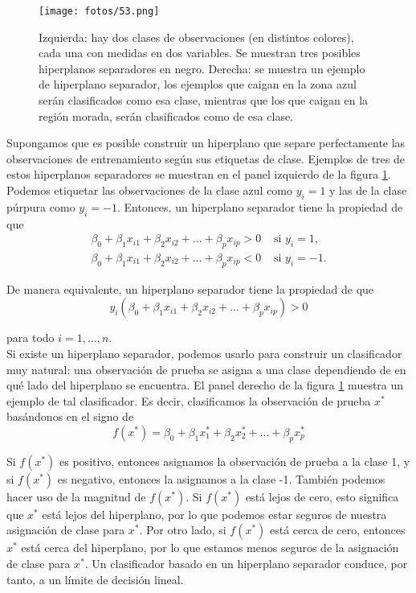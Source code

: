 \begin{figure}[h]
\centering
\texttt{[image: fotos/53.png]}
\caption{Izquierda: hay dos clases de observaciones (en distintos colores), cada una con medidas en dos variables. Se muestran tres posibles hiperplanos separadores en negro. Derecha: se muestra un ejemplo de hiperplano separador, los ejemplos que caigan en la zona azul serán clasificados como esa clase, mientras que los que caigan en la región morada, serán clasificados como de esa clase.}
\label{fig:9.2}
\end{figure}

Supongamos que es posible construir un hiperplano que separe perfectamente las observaciones de entrenamiento según sus etiquetas de clase. Ejemplos de tres de estos hiperplanos separadores se muestran en el panel izquierdo de la figura \ref{fig:9.2}. Podemos etiquetar las observaciones de la clase azul como $y_i = 1$ y las de la clase púrpura como $y_i = -1$. Entonces, un hiperplano separador tiene la propiedad de que
\begin{align}
\beta_0 + \beta_1 x_{i1} + \beta_2 x_{i2} + \ldots + \beta_p x_{ip} > 0 &\text{ si } y_i = 1, \\
\beta_0 + \beta_1 x_{i1} + \beta_2 x_{i2} + \ldots + \beta_p x_{ip} < 0 &\text{ si } y_i = -1.
\end{align}

\noindent De manera equivalente, un hiperplano separador tiene la propiedad de que
\begin{equation}
y_i (\beta_0 + \beta_1 x_{i1} + \beta_2 x_{i2} + \ldots + \beta_p x_{ip}) > 0
\end{equation}

\noindent para todo $i = 1, \ldots, n$. \\

Si existe un hiperplano separador, podemos usarlo para construir un clasificador muy natural: una observación de prueba se asigna a una clase dependiendo de en qué lado del hiperplano se encuentra. El panel derecho de la figura \ref{fig:9.2} muestra un ejemplo de tal clasificador. Es decir, clasificamos la observación de prueba $x^*$ basándonos en el signo de 
\begin{equation}
f(x^*) = \beta_0 + \beta_1 x^*_1 + \beta_2 x^*_2 + \ldots + \beta_p x^*_p
\end{equation}

Si $f(x^*)$ es positivo, entonces asignamos la observación de prueba a la clase 1, y si $f(x^*)$ es negativo, entonces la asignamos a la clase -1. También podemos hacer uso de la magnitud de $f(x^*)$. Si $f(x^*)$ está lejos de cero, esto significa que $x^*$ está lejos del hiperplano, por lo que podemos estar seguros de nuestra asignación de clase para $x^*$. Por otro lado, si $f(x^*)$ está cerca de cero, entonces $x^*$ está cerca del hiperplano, por lo que estamos menos seguros de la asignación de clase para $x^*$. Un clasificador basado en un hiperplano separador conduce, por tanto, a un límite de decisión lineal.

